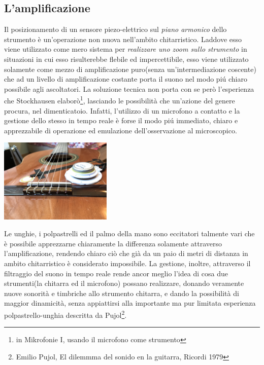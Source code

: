 \documentclass[oneside]{article}
\begin{document}
\begin{multicols*}{2}
\subsection{L'amplificazione} 
Il posizionamento di un sensore piezo-elettrico sul \textit{piano armonico} dello strumento è un'operazione non nuova nell'ambito chitarristico. Laddove esso viene utilizzato come mero sistema per \textit{realizzare uno zoom sullo strumento} in situazioni in cui esso risulterebbe flebile ed impercettibile, esso viene utilizzato solamente come mezzo di amplificazione puro(senza un'intermediazione coscente) che ad un livello di amplificazione costante porta il suono nel modo piú chiaro possibile agli ascoltatori. La soluzione tecnica non porta con se però l'esperienza che Stockhausen elaborò\footnote{in Mikrofonie I, usando il microfono come strumento}, lasciando le possibilità che un'azione del genere procura, nel dimenticatoio. Infatti, l'utilizzo di un microfono a contatto e la gestione dello stesso in tempo reale è forse il modo piú immediato, chiaro e apprezzabile di operazione ed emulazione dell'osservazione al microscopico.

\includegraphics[width=0.4\textwidth]{img/chit.jpg}

Le unghie, i polpastrelli ed il palmo della mano sono eccitatori talmente vari che è possibile apprezzarne chiaramente la differenza solamente attraverso l'amplificazione, rendendo chiaro ciò che già da un paio di metri di distanza in ambito chitarristico è considerato impossibile. La gestione, inoltre, attraverso il filtraggio del suono in tempo reale rende ancor meglio l'idea di cosa due strumenti(la chitarra ed il microfono) possano realizzare, donando veramente nuove sonorità e timbriche allo strumento chitarra, e dando la possibilità di maggior dinamicità, senza appiattirsi alla importante ma pur limitata esperienza polpastrello-unghia descritta da Pujol\footnote{Emilio Pujol, El dilemmma del sonido en la guitarra, Ricordi 1979}.


\end{multicols*}
\end{document}
